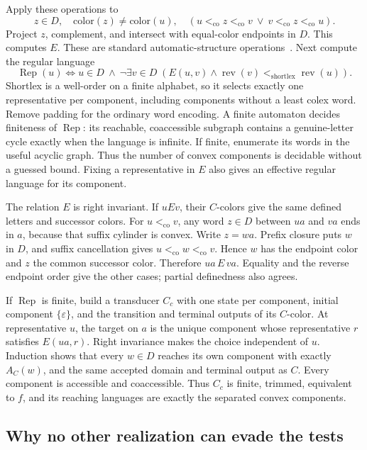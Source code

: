 \documentclass[acmsmall,screen,nonacm,11pt]{acmart}
\newcommand{\eps}{\varepsilon}
\newcommand{\co}{\mathrel{<_{\mathrm{co}}}}
\newcommand{\rev}{\operatorname{rev}}
\newcommand{\Rep}{\operatorname{Rep}}
\theoremstyle{definition}
\begin{document}
Apply these operations to
\[
 z\in D,\quad \mathrm{color}(z)\ne\mathrm{color}(u),\quad
 (u\co z\co v\ \lor\ v\co z\co u).
\]
Project $z$, complement, and intersect with equal-color endpoints in $D$.
This computes $E$. These are standard automatic-structure
operations~\cite{Blum99,BG00}. Next compute the regular language
\begin{equation}\label{eq:rep}
 \Rep(u)\iff u\in D\ \land\
 \neg\exists v\in D\;(E(u,v)\land
            \rev(v)<_{\mathrm{shortlex}}\rev(u)).
\end{equation}
Shortlex is a well-order on a finite alphabet, so it selects exactly one
representative per component, including components without a least colex
word. Remove padding for the ordinary word encoding. A finite automaton
decides finiteness of $\Rep$: its reachable, coaccessible subgraph contains
a genuine-letter cycle exactly when the language is infinite. If finite,
enumerate its words in the useful acyclic graph. Thus the number of convex
components is decidable without a guessed bound. Fixing a representative
in $E$ also gives an effective regular language for its component.

The relation $E$ is right invariant. If $uEv$, their $C$-colors give the same
defined letters and successor colors. For $u\co v$, any word $z\in D$
between $ua$ and $va$ ends in $a$, because that suffix cylinder is convex.
Write $z=wa$. Prefix closure puts $w$ in $D$, and suffix cancellation gives
$u\co w\co v$. Hence $w$ has the endpoint color and $z$ the common
successor color. Therefore $ua\,E\,va$. Equality and the reverse endpoint
order give the other cases; partial definedness also agrees.

If $\Rep$ is finite, build a transducer $C_c$ with one state per component,
initial component $\{\eps\}$, and the transition and terminal outputs of
its $C$-color. At representative $u$, the target on $a$ is the unique
component whose representative $r$ satisfies $E(ua,r)$. Right invariance
makes the choice independent of $u$. Induction shows that every $w\in D$
reaches its own component with exactly $A_C(w)$, and the same accepted
domain and terminal output as $C$. Every component is accessible and
coaccessible. Thus $C_c$ is finite, trimmed, equivalent to $f$, and its
reaching languages are exactly the separated convex components.

\subsection{Why no other realization can evade the tests}
\end{document}
